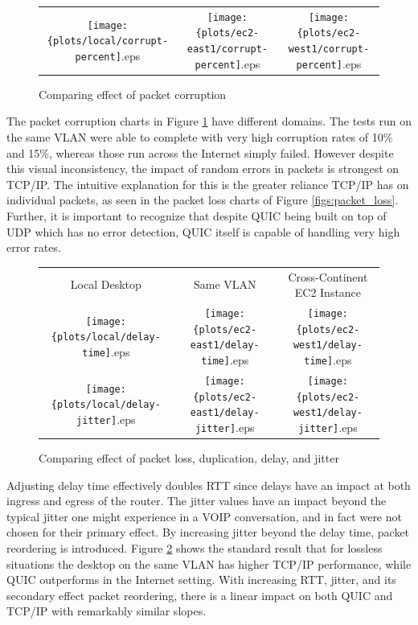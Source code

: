 \documentclass[12pt]{article}
\begin{document}
\begin{figure}[h]
\centering
\begin{tabular}{c c c}
	\texttt{[image: \{plots/local/corrupt-percent]}.eps} &
	\texttt{[image: \{plots/ec2-east1/corrupt-percent]}.eps} &
	\texttt{[image: \{plots/ec2-west1/corrupt-percent]}.eps} \\
\end{tabular}
\caption{Comparing effect of packet corruption}
\label{figs:packet_corruption}
\end{figure}

The packet corruption charts in Figure \ref{figs:packet_corruption} have different domains. The tests run on the same VLAN were able to complete with very high corruption rates of 10\% and 15\%, whereas those run across the Internet simply failed. However despite this visual inconsistency, the impact of random errors in packets is strongest on TCP/IP. The intuitive explanation for this is the greater reliance TCP/IP has on individual packets, as seen in the packet loss charts of Figure \ref{figs:packet_loss}. Further, it is important to recognize that despite QUIC being built on top of UDP which has no error detection, QUIC itself is capable of handling very high error rates.

\begin{figure}[h]
\centering
\begin{tabular}{c c c}
	Local Desktop & Same VLAN & Cross-Continent EC2 Instance \\
	\texttt{[image: \{plots/local/delay-time]}.eps} &
	\texttt{[image: \{plots/ec2-east1/delay-time]}.eps} &
	\texttt{[image: \{plots/ec2-west1/delay-time]}.eps} \\

	\texttt{[image: \{plots/local/delay-jitter]}.eps} &
	\texttt{[image: \{plots/ec2-east1/delay-jitter]}.eps} &
	\texttt{[image: \{plots/ec2-west1/delay-jitter]}.eps} \\
\end{tabular}
\caption{Comparing effect of packet loss, duplication, delay, and jitter}
\label{figs:packet_timing}
\end{figure}

Adjusting delay time effectively doubles RTT since delays have an impact at both ingress and egress of the router. The jitter values have an impact beyond the typical jitter one might experience in a VOIP conversation, and in fact were not chosen for their primary effect. By increasing jitter beyond the delay time, packet reordering is introduced. Figure \ref{figs:packet_timing} shows the standard result that for lossless situations the desktop on the same VLAN has higher TCP/IP performance, while QUIC outperforms in the Internet setting. With increasing RTT, jitter, and its secondary effect packet reordering, there is a linear impact on both QUIC and TCP/IP with remarkably similar slopes.
\end{document}
